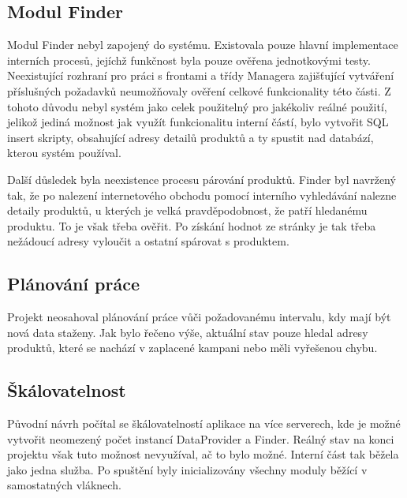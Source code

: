 \documentclass[thesis=B,czech]{FITthesis}[2012/06/26]
\begin{document}
\subsection{Modul Finder}
Modul Finder nebyl zapojený do systému. Existovala pouze hlavní implementace interních procesů, jejíchž funkčnost byla
pouze ověřena jednotkovými testy. Neexistující rozhraní pro práci s frontami a třídy Managera zajišťující vytváření příslušných požadavků
neumožňovaly ověření celkové funkcionality této části. Z tohoto důvodu nebyl systém jako celek použitelný pro jakékoliv reálné použití, jelikož
jediná možnost jak využít funkcionalitu interní částí, bylo vytvořit SQL insert skripty, obsahující adresy detailů produktů
a ty spustit nad databází, kterou systém používal.
\par
Další důsledek byla neexistence procesu párování produktů. Finder byl navržený tak, že po nalezení internetového obchodu
pomocí interního vyhledávání nalezne detaily produktů, u kterých je velká pravděpodobnost, že patří hledanému produktu.
To je však třeba ověřit. Po získání hodnot ze stránky je tak třeba nežádoucí adresy vyloučit a ostatní spárovat s produktem.
\subsection{Plánování práce}
Projekt neosahoval plánování práce vůči požadovanému intervalu, kdy mají být nová data
staženy. Jak bylo řečeno výše, aktuální stav pouze hledal adresy produktů, které se nachází v zaplacené kampani nebo měli vyřešenou chybu.
\subsection{Škálovatelnost}
Původní návrh počítal se škálovatelností aplikace na více serverech, kde je možné vytvořit neomezený počet instancí DataProvider a Finder. Reálný stav
na konci projektu však tuto možnost nevyužíval, ač to bylo možné. Interní část tak běžela jako jedna služba. Po spuštění
byly inicializovány všechny moduly běžící v samostatných vláknech.
\end{document}
